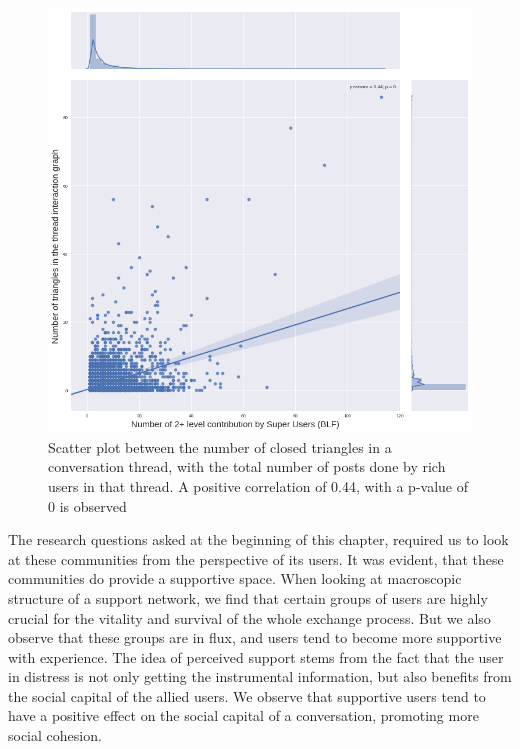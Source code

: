 \begin{figure}[!ht]
\centering
\includegraphics[width=0.7\linewidth ]{SUParticipationTriangles.png}

\caption{Scatter plot between the number of closed triangles in a conversation thread, with the total number of posts done by rich users in that thread. A positive correlation of 0.44, with a p-value of 0 is observed}
\label{fig:TriCorr}
\end{figure}



The research questions asked at the beginning of this chapter, required us to look at these communities from the perspective of its users. It was evident, that these communities do provide a supportive space. 
When looking at macroscopic structure of a support network, we find that certain groups of users are highly crucial for the vitality and survival of the whole exchange process. But we also observe that these groups are in flux, and users tend to become more supportive with experience. 
The idea of perceived support stems from the fact that the user in distress is not only getting the instrumental information, but also benefits from the social capital of the allied users. We observe that supportive users tend to have a positive effect on the social capital of a conversation, promoting more social cohesion.

